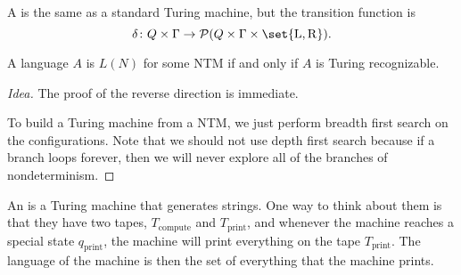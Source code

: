\documentclass{standalone}
\begin{document}
\begin{definition}
	A  is the same as a standard Turing machine, but the transition function is
	\[
		\delta \colon Q \times \Gamma \to \mathcal{P}(Q \times \Gamma \times \set{\mathrm L, \mathrm R}).
	\]
\end{definition}

\begin{proposition}
	A language \(A\) is \(L(N)\) for some \textsf{NTM} if and only if \(A\) is Turing recognizable.
\end{proposition}
\begin{proof}[Idea]
	The proof of the reverse direction is immediate.

	To build a Turing machine from a \textsf{NTM}, we just perform breadth first search on the configurations. Note that we should not use depth first search because if a branch loops forever, then we will never explore all of the branches of nondeterminism.
\end{proof}

\begin{definition}
	An  is a Turing machine that generates strings. One way to think about them is that they have two tapes, \(T_{\text{compute}}\) and \(T_{\text{print}}\), and whenever the machine reaches a special state \(q_{\text{print}}\), the machine will print everything on the tape \(T_{\text{print}}\). The language of the machine is then the set of everything that the machine prints.
\end{definition}
\end{document}
